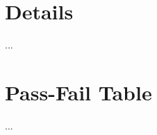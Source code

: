 \documentclass[twocolumn,tighten,dvipsnames]{aastex63}
\newcommand\<{{\langle}}
\renewcommand\>{{\rangle}} %
\begin{document}
\appendix
\section{Details}
\label{sec:details}

...

\section{Pass-Fail Table}
\label{sec:passfail}

...




\end{document}
